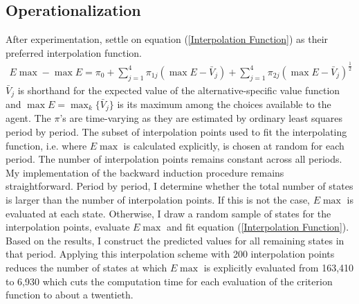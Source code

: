 \subsection{Operationalization}
After experimentation, \citet{Keane.1994} settle on equation (\ref{Interpolation Function}) as their preferred interpolation function.
%
\begin{align}\label{Interpolation Function}
E \max - \max E = \pi_0 + \sum^4_{j = 1} \pi_{1j} (\max E - \bar{V}_j) +
\sum^4_{j = 1} \pi_{2j} \left(\max E - \bar{V}_j\right)^{\tfrac{1}{2}}
\end{align}
%
$\bar{V}_j$ is shorthand for the expected value of the alternative-specific value function and $\max E = \max_k\{\bar{V}_j\}$ is its maximum among the choices available to the agent. The $\pi$'s are time-varying as they are estimated by ordinary least squares period by period. The subset of interpolation points used to fit the interpolating function, i.e. where $E\max$ is calculated explicitly, is chosen at random for each period. The number of interpolation points remains constant across all periods.\\\newline
%
My implementation of the backward induction procedure remains straightforward. Period by period, I determine whether the total number of states is larger than the number of interpolation points. If this is not the case, $E\max$ is evaluated at each state. Otherwise, I draw a random sample of states for the interpolation points, evaluate $E\max$ and fit equation (\ref{Interpolation Function}). Based on the results, I construct the predicted values for all remaining states in that period. Applying this interpolation scheme with 200 interpolation points reduces the number of states at which $E\max$ is explicitly evaluated from 163,410 to 6,930 which cuts the computation time for each evaluation of the criterion function to about a twentieth.
